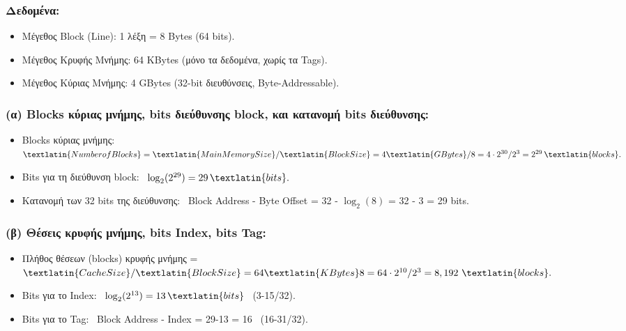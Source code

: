 \documentclass{article}
\begin{document}
\subsubsection*{\textbf{Δεδομένα:}}
\begin{itemize}
    \item {Μέγεθος} \textlatin{Block (Line)}: 1 {λέξη} = 8 \textlatin{Bytes} (64 \textlatin{bits}).
    \item {Μέγεθος Κρυφής Μνήμης}: 64 \textlatin{KBytes} ({μόνο τα δεδομένα, χωρίς τα} \textlatin{Tags}).
    \item {Μέγεθος Κύριας Μνήμης}: 4 \textlatin{GBytes} ({32-bit διευθύνσεις}, \textlatin{Byte-Addressable}).
\end{itemize}

\vspace{0.5cm}

\subsubsection*{\textbf{(α) \textlatin{Blocks} κύριας μνήμης, \textlatin{bits} διεύθυνσης \textlatin{block}, και κατανομή \textlatin{bits} διεύθυνσης:}}
\begin{itemize}
    \item \textlatin{Blocks} κύριας μνήμης: \ $ \textlatin{Number of Blocks} = {\textlatin{Main Memory Size}}/{\textlatin{Block Size}} = {4 \textlatin{GBytes}}/{8} = 4\cdot2^{30}/2^3 = 2^{29} \, \textlatin{blocks}. $
    \item \textlatin{{Bits}} για τη διεύθυνση \textlatin{block}: \ $ \log_2(2^{29}) = 29 \, \textlatin{bits}. $
    \item Κατανομή των 32 \textlatin{bits} {της διεύθυνσης}: \ \textlatin{Block Address} - \textlatin{Byte Offset} = 32 - $\log_2(8)$ = 32 - 3 = 29 \textlatin{bits.}
\end{itemize}


\subsubsection*{\textbf{(β) Θέσεις κρυφής μνήμης, \textlatin{bits} \textlatin{Index}, \textlatin{bits} \textlatin{Tag}:}}
\begin{itemize}
    \item Πλήθος θέσεων (\textlatin{blocks}) κρυφής μνήμης = $ {\textlatin{Cache Size}}/{\textlatin{Block Size}} = {64 \textlatin{KBytes}}{8} = 64\cdot2^{10}/2^3 = 8,192 \ \textlatin{blocks}. $
    \item \textlatin{Bits} {για το} \textlatin{Index}: \ $\log_2(2^{13}) = 13 \, \textlatin{bits}$ \ (3-15/32).
    \item \textlatin{Bits} {για το} \textlatin{Tag}: \ \textlatin{Block Address} - \textlatin{Index} = 29-13 = 16 \ (16-31/32).
\end{itemize}
\end{document}
